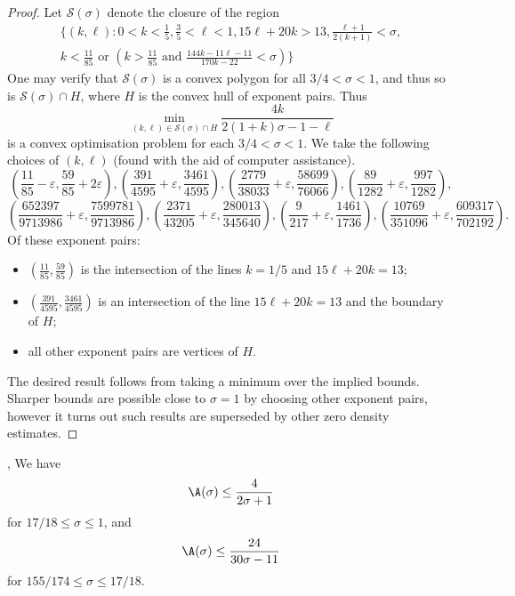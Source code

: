 \begin{proof}
Let $\mathcal{S}(\sigma)$ denote the closure of the region
\begin{align*}
\Bigg\{(k, \ell) : 0 < k < \frac{1}{5}, \frac{3}{5} < \ell < 1, 15\ell + 20k > 13, \frac{\ell + 1}{2(k + 1)} < \sigma, \\
k < \frac{11}{85} \text{ or } \left(k > \frac{11}{85} \text{ and } \frac{144k - 11\ell - 11}{170k - 22} < \sigma\right)\Bigg\}
\end{align*}
One may verify that $\mathcal{S}(\sigma)$ is a convex polygon for all $3/4 < \sigma < 1$, and thus so is $\mathcal{S}(\sigma) \cap H$, where $H$ is the convex hull of exponent pairs. Thus
\[
\min_{(k, \ell) \in \mathcal{S}(\sigma) \cap H}\frac{4k}{2(1 + k)\sigma - 1 - \ell}
\]
is a convex optimisation problem for each $3/4 < \sigma < 1$.
We take the following choices of $(k, \ell)$ (found with the aid of computer assistance).
\[
\left(\frac{11}{85} - \varepsilon, \frac{59}{85} + 2\varepsilon\right),
\left(\frac{391}{4595} + \varepsilon, \frac{3461}{4595}\right),
\left(\frac{2779}{38033} + \varepsilon, \frac{58699}{76066}\right),
\left(\frac{89}{1282} + \varepsilon, \frac{997}{1282}\right),
\]
\[
\left(\frac{652397}{9713986} + \varepsilon, \frac{7599781}{9713986}\right),
\left(\frac{2371}{43205} + \varepsilon, \frac{280013}{345640}\right),
\left(\frac{9}{217} + \varepsilon, \frac{1461}{1736}\right), \left(\frac{10769}{351096} + \varepsilon, \frac{609317}{702192}\right).
\]
Of these exponent pairs:
\begin{itemize}
    \item $(\frac{11}{85}, \frac{59}{85})$ is the intersection of the lines $k = 1/5$ and $15\ell + 20k = 13$;
    \item $(\frac{391}{4595}, \frac{3461}{4595})$ is an intersection of the line $15\ell + 20k = 13$ and the boundary of $H$;
    \item all other exponent pairs are vertices of $H$.
\end{itemize}
The desired result follows from taking a minimum over the implied bounds. Sharper bounds are possible close to $\sigma = 1$ by choosing other exponent pairs, however it turns out such results are superseded by other zero density estimates.
\end{proof}


\begin{lemma}\label{ivic-zero-density}\cite{ivic_exponent_pairs}, \cite[Theorem 11.2]{ivic} We have
    $$ \A(\sigma) \leq \frac{4}{2\sigma+1}$$
    for $17/18 \leq \sigma \leq 1$, and
    $$ \A(\sigma) \leq \frac{24}{30\sigma-11}$$
    for $155/174 \leq \sigma \leq 17/18$.
\end{lemma}
\literature
{}

